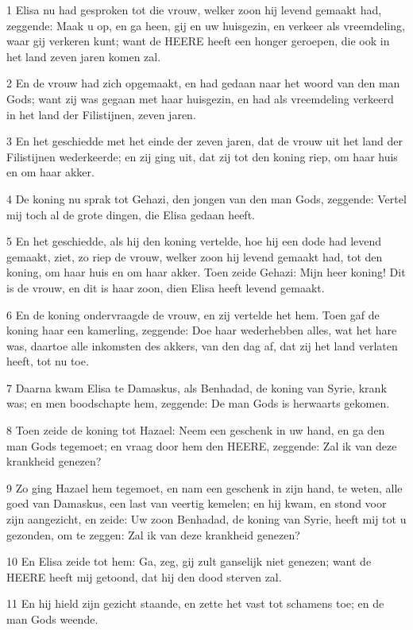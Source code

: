 \par 1 Elisa nu had gesproken tot die vrouw, welker zoon hij levend gemaakt had, zeggende: Maak u op, en ga heen, gij en uw huisgezin, en verkeer als vreemdeling, waar gij verkeren kunt; want de HEERE heeft een honger geroepen, die ook in het land zeven jaren komen zal.
\par 2 En de vrouw had zich opgemaakt, en had gedaan naar het woord van den man Gods; want zij was gegaan met haar huisgezin, en had als vreemdeling verkeerd in het land der Filistijnen, zeven jaren.
\par 3 En het geschiedde met het einde der zeven jaren, dat de vrouw uit het land der Filistijnen wederkeerde; en zij ging uit, dat zij tot den koning riep, om haar huis en om haar akker.
\par 4 De koning nu sprak tot Gehazi, den jongen van den man Gods, zeggende: Vertel mij toch al de grote dingen, die Elisa gedaan heeft.
\par 5 En het geschiedde, als hij den koning vertelde, hoe hij een dode had levend gemaakt, ziet, zo riep de vrouw, welker zoon hij levend gemaakt had, tot den koning, om haar huis en om haar akker. Toen zeide Gehazi: Mijn heer koning! Dit is de vrouw, en dit is haar zoon, dien Elisa heeft levend gemaakt.
\par 6 En de koning ondervraagde de vrouw, en zij vertelde het hem. Toen gaf de koning haar een kamerling, zeggende: Doe haar wederhebben alles, wat het hare was, daartoe alle inkomsten des akkers, van den dag af, dat zij het land verlaten heeft, tot nu toe.
\par 7 Daarna kwam Elisa te Damaskus, als Benhadad, de koning van Syrie, krank was; en men boodschapte hem, zeggende: De man Gods is herwaarts gekomen.
\par 8 Toen zeide de koning tot Hazael: Neem een geschenk in uw hand, en ga den man Gods tegemoet; en vraag door hem den HEERE, zeggende: Zal ik van deze krankheid genezen?
\par 9 Zo ging Hazael hem tegemoet, en nam een geschenk in zijn hand, te weten, alle goed van Damaskus, een last van veertig kemelen; en hij kwam, en stond voor zijn aangezicht, en zeide: Uw zoon Benhadad, de koning van Syrie, heeft mij tot u gezonden, om te zeggen: Zal ik van deze krankheid genezen?
\par 10 En Elisa zeide tot hem: Ga, zeg, gij zult ganselijk niet genezen; want de HEERE heeft mij getoond, dat hij den dood sterven zal.
\par 11 En hij hield zijn gezicht staande, en zette het vast tot schamens toe; en de man Gods weende.
